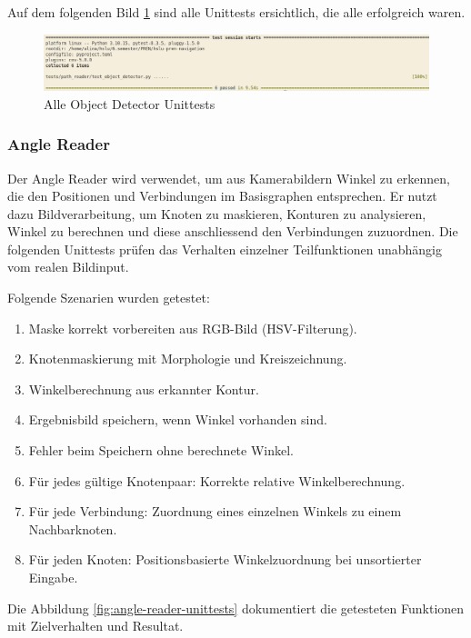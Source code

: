 Auf dem folgenden Bild \ref{img:object_detector_unittests} sind alle Unittests ersichtlich, die alle erfolgreich waren.

\begin{figure}[H]
\centering
\includegraphics[width=\textwidth]{assets/IT/testing/yolo/object-detector-unittests.png}
\caption{Alle Object Detector Unittests}
\label{img:object_detector_unittests}
\end{figure}


\newpage
\subsubsection*{Angle Reader}\label{angle-reader-unittests}

Der Angle Reader wird verwendet, um aus Kamerabildern Winkel zu erkennen, die den Positionen und Verbindungen im Basisgraphen entsprechen. Er nutzt dazu Bildverarbeitung, um Knoten zu maskieren, Konturen zu analysieren, Winkel zu berechnen und diese anschliessend den Verbindungen zuzuordnen. Die folgenden Unittests prüfen das Verhalten einzelner Teilfunktionen unabhängig vom realen Bildinput.

Folgende Szenarien wurden getestet:

\begin{enumerate}
\item Maske korrekt vorbereiten aus RGB-Bild (HSV-Filterung).
\item Knotenmaskierung mit Morphologie und Kreiszeichnung.
\item Winkelberechnung aus erkannter Kontur.
\item Ergebnisbild speichern, wenn Winkel vorhanden sind.
\item Fehler beim Speichern ohne berechnete Winkel.
\item Für jedes gültige Knotenpaar: Korrekte relative Winkelberechnung.
\item Für jede Verbindung: Zuordnung eines einzelnen Winkels zu einem Nachbarknoten.
\item Für jeden Knoten: Positionsbasierte Winkelzuordnung bei unsortierter Eingabe.
\end{enumerate}

Die Abbildung \ref{fig:angle-reader-unittests} dokumentiert die getesteten Funktionen mit Zielverhalten und Resultat.

